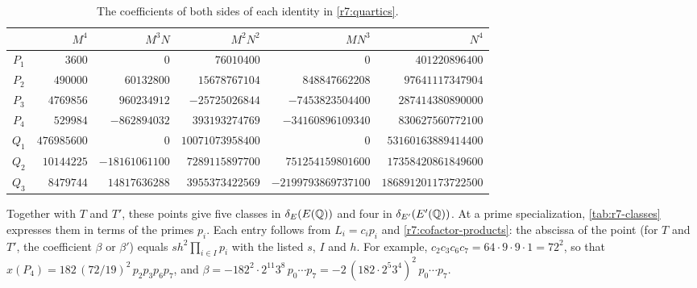 \begin{table}[htbp]
\centering
\caption{The coefficients of both sides of each identity in
\eqref{r7:quartics}.}
\label{tab:r7-coeff}
\footnotesize
\setlength{\tabcolsep}{4pt}
\begin{tabular}{crrrrr}
\toprule
 & $M^4$ & $M^3N$ & $M^2N^2$ & $MN^3$ & $N^4$\\
\midrule
$P_1$ & $3600$ & $0$ & $76010400$ & $0$ & $401220896400$\\
$P_2$ & $490000$ & $60132800$ & $15678767104$ & $848847662208$ & $97641117347904$\\
$P_3$ & $4769856$ & $960234912$ & $-25725026844$ & $-7453823504400$ & $287414380890000$\\
$P_4$ & $529984$ & $-862894032$ & $393193274769$ & $-34160896109340$ & $830627560772100$\\
$Q_1$ & $476985600$ & $0$ & $10071073958400$ & $0$ & $53160163889414400$\\
$Q_2$ & $10144225$ & $-18161061100$ & $7289115897700$ & $751254159801600$ & $17358420861849600$\\
$Q_3$ & $8479744$ & $14817636288$ & $3955373422569$ & $-2199793869737100$ & $186891201173722500$\\
\bottomrule
\end{tabular}
\end{table}

Together with $T$ and $T'$, these points give five classes in
$\delta_E(E(\mathbb Q))$ and four in $\delta_{E'}(E'(\mathbb Q))$. At a prime
specialization, \cref{tab:r7-classes} expresses them in terms of the primes
$p_i$. Each entry follows from $L_i=c_ip_i$ and
\eqref{r7:cofactor-products}: the abscissa of the point (for $T$ and $T'$,
the coefficient $\beta$ or $\beta'$) equals $sh^2\prod_{i\in I}p_i$ with the listed $s$, $I$ and $h$. For example,
$c_2c_3c_6c_7=64\cdot9\cdot9\cdot1=72^2$, so that
$x(P_4)=182\,(72/19)^2\,p_2p_3p_6p_7$, and
$\beta=-182^2\cdot2^{11}3^8\,p_0\cdots p_7=-2\,(182\cdot2^5 3^4)^2\,p_0\cdots p_7$.

